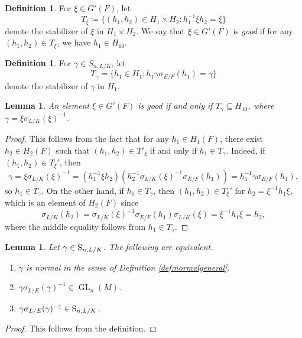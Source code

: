 \documentclass[11pt, reqno]{amsart}
\numberwithin{equation}{subsection}
\theoremstyle{plain}
\newtheorem{lem}[proposition]{Lemma}
\theoremstyle{definition}
\newtheorem{definition}[proposition]{Definition}
\renewcommand{\S}{\textnormal{S}}
\DeclareMathOperator{\GL}{GL}
\begin{document}
\begin{definition}
For $\xi \in G'(F)$, let
\[
    T_\xi \coloneqq \{(h_1, h_2) \in H_1 \times H_2
    : h_1^{-1}\xi h_2 = \xi\}
\]
denote the stabilizer of $\xi$ in $H_1 \times H_2$.
We say that $\xi \in G'(F)$ is
\emph{good} if for any $(h_1, h_2) \in T_\xi$, 
we have $h_1 \in H_{10}$. 
\end{definition}

\begin{definition}
\label{def:glnormal}
For $\gamma \in S_{n, L/K}$, let
\[
    T_\gamma = \{h_1 \in H_1 : h_1\gamma
    \sigma_{E/F}(h_1) = \gamma\}
\]
denote the stabilizer of $\gamma$ in $H_1$.
\end{definition}

\begin{lem}
\label{lem:goodsn}
An element $\xi \in G'(F)$ is good if and only if
$T_\gamma \subseteq H_{10}$, where
$\gamma = \xi\sigma_{L/K}(\xi)^{-1}$.
\end{lem}
\begin{proof}
This follows from the fact that for any $h_1 \in H_1(F)$, 
there exist $h_2 \in H_2(F)$ such that
$(h_1, h_2) \in T'_\xi$ if and only if $h_1 \in T_\gamma$.
Indeed, if $(h_1, h_2) \in T_\xi'$, then 
\[
    \gamma = \xi \sigma_{L/K}(\xi)^{-1}
    = (h_1^{-1} \xi h_2)(h_2^{-1} \sigma_{L/K}(\xi)^{-1} \sigma_{E/F}(h_1))
    = h_1^{-1} \gamma \sigma_{E/F}(h_1),
\]
so $h_1 \in T_\gamma$. On the other hand, if $h_1 \in T_\gamma$,
then $(h_1, h_2) \in T_\xi'$ for $h_2 = \xi^{-1}h_1\xi$, which
is an element of $H_2(F)$ since
\[
    \sigma_{L/K}(h_2) = \sigma_{L/K}(\xi)^{-1} \sigma_{E/F}(h_1)
    \sigma_{L/K}(\xi) = \xi^{-1} h_1 \xi = h_2,
\] 
where the middle equality follows from $h_1 \in T_\gamma$.
\end{proof}

\begin{lem}
\label{lem:normalequivdefs}
Let $\gamma \in \S_{n, L/K}$.
The following are equivalent.
\begin{enumerate}[(1)]
\item $\gamma$ is normal in the sense of Definition
\ref{def:normalgeneral}.
\item $\gamma\sigma_{L/E}(\gamma)^{-1} \in \GL_n(M)$.
\item $\gamma\sigma_{L/E}(\gamma)^{-1} \in \S_{n, L/K}$.
\end{enumerate}
\end{lem}
\begin{proof}
This follows from the definition.
\end{proof}
\end{document}
